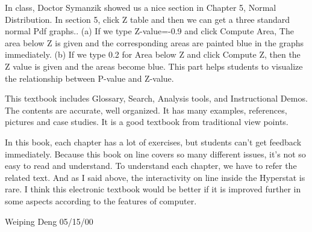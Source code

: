 In class, Doctor Symanzik showed us a nice section in Chapter 5, Normal
Distribution. In section 5, click Z table and then we can get a three standard
normal Pdf graphs.. (a) If we type Z-value=-0.9 and click Compute Area, The
area below Z is given and the corresponding areas are painted blue in the
graphs immediately. (b) If we type 0.2 for Area below Z and click Compute Z,
then the Z value is given and the areas become blue. This part helps students
to visualize the relationship between P-value and Z-value.

This textbook includes Glossary, Search, Analysis tools, and Instructional
Demos. The contents are accurate, well organized. It has many examples,
references, pictures and case studies. It is a good textbook from traditional
view points.

In this book, each chapter has a lot of exercises, but students can't get
feedback immediately. Because this book on line covers so many different
issues, it's not so easy to read and understand. To understand each chapter,
we have to refer the related text. And as I said above, the interactivity on
line inside the Hyperstat is rare. I think this electronic textbook would be
better if it is improved further in some aspects according to the features of
computer.

Weiping Deng
05/15/00

